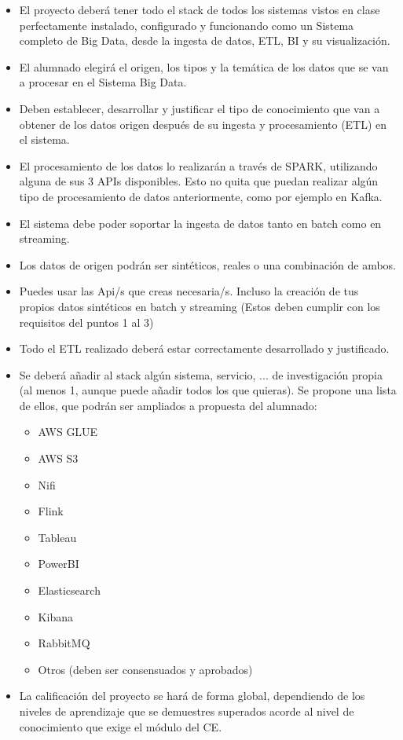 \documentclass[12pt]{article}
\begin{document}
\begin{itemize}
  \item El proyecto deberá tener todo el stack de todos los sistemas vistos en clase perfectamente instalado, configurado y funcionando como un 
  Sistema completo de Big Data, desde la ingesta de datos, ETL, BI y su visualización.

  \item El alumnado elegirá el origen, los tipos y la temática de los datos que se van a procesar en el Sistema Big Data.
  
  \item Deben establecer, desarrollar y justificar el tipo de conocimiento que van a obtener de los datos origen después de su ingesta y 
  procesamiento (ETL) en el sistema.

  \item El procesamiento de los datos lo realizarán a través de SPARK, utilizando alguna de sus 3 APIs disponibles. Esto no quita que puedan 
  realizar algún tipo de procesamiento de datos anteriormente, como por ejemplo en Kafka.

  \item El sistema debe poder soportar la ingesta de datos tanto en batch como en streaming.
  
  \item Los datos de origen podrán ser sintéticos, reales o una combinación de ambos.
  
  \item Puedes usar las Api/s que creas necesaria/s. Incluso la creación de tus propios datos sintéticos en batch y streaming 
  (Estos deben cumplir con los requisitos del puntos 1 al 3)

  \item Todo el ETL realizado deberá estar correctamente desarrollado y justificado.
  
  \item Se deberá añadir al stack algún sistema, servicio, ... de investigación propia 
  (al menos 1, aunque puede añadir todos los que quieras). Se propone una lista de ellos, 
  que podrán ser ampliados a propuesta del alumnado:

  \begin{itemize}
    \item AWS GLUE
    \item AWS S3
    \item Nifi
    \item Flink
    \item Tableau
    \item PowerBI
    \item Elasticsearch
    \item Kibana
    \item RabbitMQ
    \item Otros (deben ser consensuados y aprobados)
  \end{itemize}

  \item La calificación del proyecto se hará de forma global, dependiendo de los niveles de aprendizaje que se demuestres superados acorde 
  al nivel de conocimiento que exige el módulo del CE.
\end{itemize}
\end{document}

